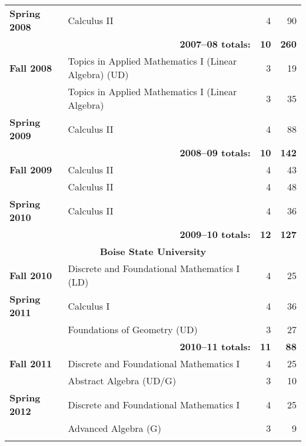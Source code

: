 \documentclass[12pt]{article}
\begin{document}
\begin{center}
\begin{longtable}{@{} l @{\hspace{1ex}} l @{} rr @{}}
\textbf{Spring 2008} & Calculus II & 4 & 90 \\
 \cmidrule{2-4}
 & \multicolumn{1}{r}{\textbf{2007--08 totals:}} & \textbf{10} & \textbf{260} \\
 \cmidrule{2-4}

\textbf{Fall 2008} & Topics in Applied Mathematics I (Linear Algebra) (UD) & 3 & 19 \\
 & Topics in Applied Mathematics I (Linear Algebra) & 3 & 35 \\
\addlinespace[0.1in]

\textbf{Spring 2009} & Calculus II & 4 & 88 \\
 \cmidrule{2-4}
 & \multicolumn{1}{r}{\textbf{2008--09 totals:}} & \textbf{10} & \textbf{142} \\
 \cmidrule{2-4}

\textbf{Fall 2009} & Calculus II & 4 & 43 \\
 & Calculus II & 4 & 48 \\
\addlinespace[0.1in]

\textbf{Spring 2010} & Calculus II & 4 & 36 \\
 \cmidrule{2-4}
 & \multicolumn{1}{r}{\textbf{2009--10 totals:}} & \textbf{12} & \textbf{127} \\

\midrule

\multicolumn{4}{c}{\textbf{Boise State University}} \\
\addlinespace[0.1in]

\textbf{Fall 2010} & Discrete and Foundational Mathematics I (LD) & 4 & 25 \\
\addlinespace[0.1in]

\textbf{Spring 2011} & Calculus I & 4 & 36 \\
 & Foundations of Geometry (UD) & 3 & 27 \\
 \cmidrule{2-4}
 & \multicolumn{1}{r}{\textbf{2010--11 totals:}} & \textbf{11} & \textbf{88} \\
 \cmidrule{2-4}

\textbf{Fall 2011} & Discrete and Foundational Mathematics I & 4 & 25 \\
 & Abstract Algebra (UD/G) & 3 & 10 \\
\addlinespace[0.1in]

\textbf{Spring 2012} & Discrete and Foundational Mathematics I & 4 & 25 \\
 & Advanced Algebra (G) & 3 & 9 \\
\addlinespace[0.1in]


\end{longtable}
\end{center}
\end{document}
